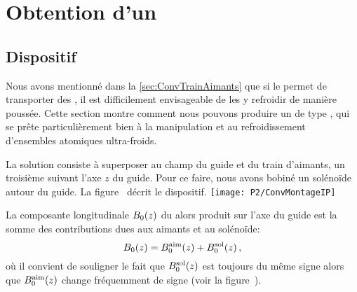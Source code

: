 \section{Obtention d'un \tpIP}\label{sec:ConvTrainIP}

\subsection{Dispositif}
Nous avons mentionné dans la \autoref{sec:ConvTrainAimants} que si le \tpqp permet de transporter des \pats, il est difficilement envisageable de les y refroidir de manière poussée. %
Cette section montre comment nous pouvons produire un \tp de type \IP, qui se prête particulièrement bien à la manipulation et au refroidissement d'ensembles atomiques ultra-froids.

La solution consiste à superposer au champ du guide et du train d'aimants, un troisième \chm suivant l'axe $z$ du guide. Pour ce faire, nous avons bobiné un solénoïde autour du guide. La figure~ décrit le dispositif. 
\bfigh
\texttt{[image: P2/ConvMontageIP]}
\label{fig:ConvMontageIP}
\efigh

La composante longitudinale ${B_0}(z)$ du \chm alors produit sur l'axe du guide est la somme des contributions dues aux aimants et au solénoïde:%
%
\begin{equation}
	\Bpara(z) = \ConvBparaAim(z) + \ConvBparaSol(z)
\virguleformule
	\label{eq:BparaConv}
\end{equation}
%
où il convient de souligner le fait que ${B_{0}^{\rm sol}}(z)$ est toujours du même signe alors que ${B_{0}^{\rm aim}}(z)$ change fréquemment de signe (voir la figure~).

\casse

